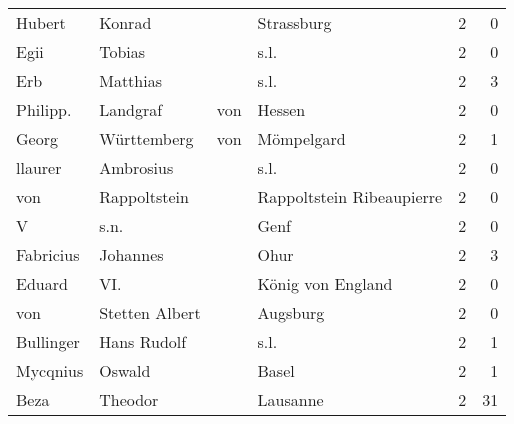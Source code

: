 \begin{center}
\begin{tiny}
\begin{longtabu}{llllrr}
                   Hubert &                             Konrad &             &                                  Strassburg &          2 &         0 \\
                     Egii &                             Tobias &             &                                        s.l. &          2 &         0 \\
                      Erb &                           Matthias &             &                                        s.l. &          2 &         3 \\
                 Philipp. &                           Landgraf &         von &                                      Hessen &          2 &         0 \\
                    Georg &                        Württemberg &         von &                                  Mömpelgard &          2 &         1 \\
                  llaurer &                          Ambrosius &             &                                        s.l. &          2 &         0 \\
                      von &                       Rappoltstein &             &                   Rappoltstein Ribeaupierre &          2 &         0 \\
                        V &                               s.n. &             &                                        Genf &          2 &         0 \\
                Fabricius &                           Johannes &             &                                        Ohur &          2 &         3 \\
                   Eduard &                                VI. &             &                           König von England &          2 &         0 \\
                      von &                     Stetten Albert &             &                                    Augsburg &          2 &         0 \\
                Bullinger &                        Hans Rudolf &             &                                        s.l. &          2 &         1 \\
                 Mycqnius &                             Oswald &             &                                       Basel &          2 &         1 \\
                     Beza &                            Theodor &             &                                    Lausanne &          2 &        31 \\

\end{longtabu}
\end{tiny}
\end{center}
